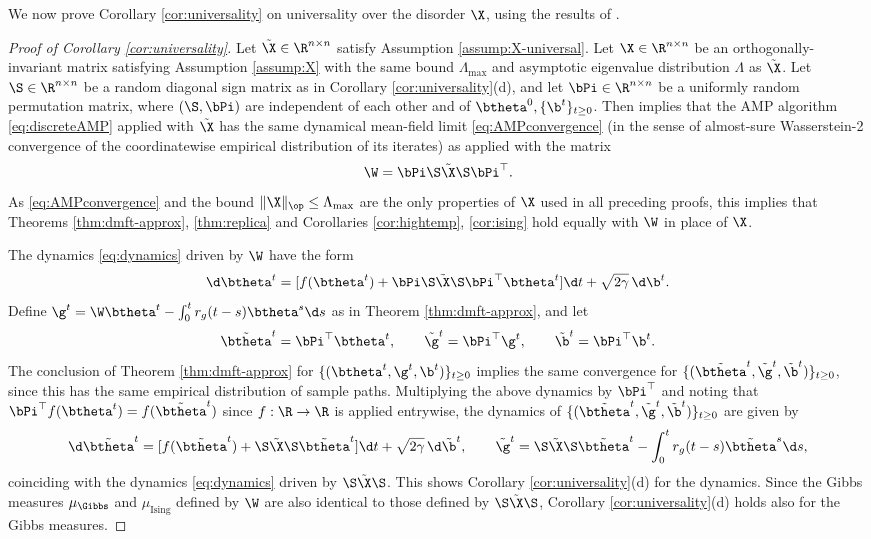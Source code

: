 We now prove Corollary \ref{cor:universality} on universality over the
disorder $\X$, using the results of \cite{wang2024universality}.

\begin{proof}[Proof of Corollary \ref{cor:universality}]
Let $\tilde \X \in \R^{n \times n}$ satisfy Assumption \ref{assump:X-universal}.
Let $\X \in \R^{n \times n}$ be an orthogonally-invariant matrix
satisfying Assumption \ref{assump:X} with the same bound $\Lambda_{\max}$ and
asymptotic eigenvalue distribution $\Lambda$ as $\tilde\X$.
Let $\S \in \R^{n \times n}$ be
a random diagonal sign matrix as in Corollary \ref{cor:universality}(d),
and let $\bPi \in \R^{n \times n}$ be a uniformly random permutation matrix,
where $(\S,\bPi)$ are independent of each other and of $\btheta^0,\{\b^t\}_{t
\geq 0}$. Then \cite[Proposition 2.7, Theorem 2.8]{wang2024universality}
implies that the AMP algorithm \eqref{eq:discreteAMP} applied with $\tilde\X$ has the
same dynamical mean-field limit \eqref{eq:AMPconvergence} (in the sense of almost-sure
Wasserstein-2 convergence of the coordinatewise empirical distribution of its
iterates) as applied with the matrix
\[\W=\bPi\S\tilde\X\S\bPi^\top.\]
As \eqref{eq:AMPconvergence} and the bound $\|\X\|_\op \leq \Lambda_{\max}$ are the only
properties of $\X$ used in all preceding proofs, this implies that
Theorems \ref{thm:dmft-approx}, \ref{thm:replica} and Corollaries
\ref{cor:hightemp}, \ref{cor:ising} hold equally with $\W$ in place of
$\X$.

The dynamics \eqref{eq:dynamics} driven by $\W$ have the form
\[\d\btheta^t=[f(\btheta^t)+\bPi\S\tilde\X\S\bPi^\top\btheta^t]\d t
+\sqrt{2\gamma}\,\d\b^t.\]
Define $\g^t=\W\btheta^t-\int_0^t r_g(t-s)\btheta^s \d s$ as in Theorem
\ref{thm:dmft-approx}, and let
\[\tilde\btheta^t=\bPi^\top \btheta^t,
\qquad \tilde\g^t=\bPi^\top \g^t,
\qquad \tilde\b^t=\bPi^\top \b^t.\]
The conclusion of Theorem \ref{thm:dmft-approx} 
for $\{(\btheta^t,\g^t,\b^t)\}_{t \geq 0}$ implies the same convergence for
$\{(\tilde\btheta^t,\tilde\g^t,\tilde\b^t)\}_{t \geq 0}$, since this has the
same empirical distribution of sample paths.
Multiplying the above dynamics by $\bPi^\top$ and noting that
$\bPi^\top f(\btheta^t)=f(\tilde\btheta^t)$ since $f:\R \to \R$ is applied
entrywise, the dynamics of $\{(\tilde\btheta^t,\tilde\g^t,\tilde\b^t)\}_{t \geq
0}$ are given by
\begin{equation}\label{eq:permutedprocess}
\d\tilde\btheta^t=[f(\tilde\btheta^t)+\S\tilde\X\S\tilde\btheta^t]\d t
+\sqrt{2\gamma}\,\d\tilde \b^t,
\qquad \tilde \g^t=\S\tilde\X\S\tilde\btheta^t-\int_0^t
r_g(t-s)\tilde\btheta^s\d s,
\end{equation}
coinciding with the dynamics \eqref{eq:dynamics} driven by $\S\tilde\X\S$.
This shows Corollary \ref{cor:universality}(d) for the dynamics.
Since the Gibbs measures $\mu_\Gibbs$ and $\mu_{\text{Ising}}$ defined by
$\W$ are also identical to those defined by $\S\tilde\X\S$,
Corollary \ref{cor:universality}(d) holds also for the Gibbs measures.


\end{proof}
